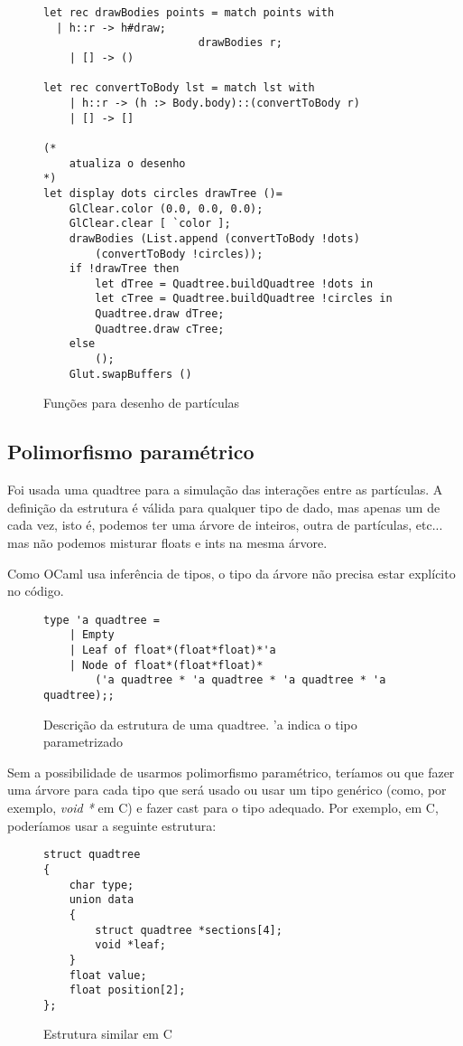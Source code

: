 \documentclass[a4paper,10pt]{article}
\begin{document}
	\begin{figure}[H]
	\centering	
	\begin{lstlisting}
let rec drawBodies points = match points with
  | h::r -> h#draw;
						drawBodies r;
	| [] -> ()

let rec convertToBody lst = match lst with
	| h::r -> (h :> Body.body)::(convertToBody r)
	| [] -> []

(*
	atualiza o desenho
*)
let display dots circles drawTree ()=
	GlClear.color (0.0, 0.0, 0.0);
	GlClear.clear [ `color ];
	drawBodies (List.append (convertToBody !dots)
		(convertToBody !circles));
	if !drawTree then
		let dTree = Quadtree.buildQuadtree !dots in
		let cTree = Quadtree.buildQuadtree !circles in
		Quadtree.draw dTree;
		Quadtree.draw cTree;
	else
		();
	Glut.swapBuffers ()
	\end{lstlisting}
	\caption{Funções para desenho de partículas}
	\end{figure}
	
\subsection{Polimorfismo paramétrico}
	
		Foi usada uma quadtree para a simulação das interações entre as partículas. A definição da estrutura é válida para qualquer tipo de dado, mas apenas um de cada vez, isto é, podemos ter uma árvore de inteiros, outra de partículas, etc... mas não podemos misturar floats e ints na mesma árvore.
		
		Como OCaml usa inferência de tipos, o tipo da árvore não precisa estar explícito no código.
		
	\begin{figure}[H]
	\centering	
	\begin{lstlisting}
type 'a quadtree =
	| Empty
	| Leaf of float*(float*float)*'a
	| Node of float*(float*float)*
		('a quadtree * 'a quadtree * 'a quadtree * 'a quadtree);;
	\end{lstlisting}
	\caption{Descrição da estrutura de uma quadtree. 'a indica o tipo parametrizado }
	\end{figure}
	
	Sem a possibilidade de usarmos polimorfismo paramétrico, teríamos ou que fazer uma árvore para cada tipo que será usado ou usar um tipo genérico (como, por exemplo, \textit{void *} em C) e fazer cast para o tipo adequado. Por exemplo, em C, poderíamos usar a seguinte estrutura:

	\begin{figure}[H]
	\centering	
	\begin{lstlisting}
struct quadtree
{
	char type;
	union data
	{
		struct quadtree *sections[4];
		void *leaf;
	}	
	float value;
	float position[2];	
};
	\end{lstlisting}
	\caption{Estrutura similar em C }
	\end{figure}
	
\end{document}
